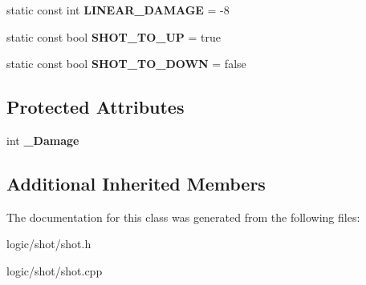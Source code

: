 \begin{DoxyCompactItemize}
\item 
\hypertarget{class_shot_a678ee4d5bb816dc0e0ece5f88e887ec3}{static const int {\bfseries L\-I\-N\-E\-A\-R\-\_\-\-D\-A\-M\-A\-G\-E} = -\/8}\label{class_shot_a678ee4d5bb816dc0e0ece5f88e887ec3}

\item 
\hypertarget{class_shot_a578cf779712b5b7752c3d900c062f49c}{static const bool {\bfseries S\-H\-O\-T\-\_\-\-T\-O\-\_\-\-U\-P} = true}\label{class_shot_a578cf779712b5b7752c3d900c062f49c}

\item 
\hypertarget{class_shot_a1e552f6e2ad653bf2b1313f870566a17}{static const bool {\bfseries S\-H\-O\-T\-\_\-\-T\-O\-\_\-\-D\-O\-W\-N} = false}\label{class_shot_a1e552f6e2ad653bf2b1313f870566a17}

\end{DoxyCompactItemize}
\subsection*{Protected Attributes}
\begin{DoxyCompactItemize}
\item 
\hypertarget{class_shot_a1aa9cf447026ba338930899bebde1d4b}{int {\bfseries \-\_\-\-Damage}}\label{class_shot_a1aa9cf447026ba338930899bebde1d4b}

\end{DoxyCompactItemize}
\subsection*{Additional Inherited Members}


The documentation for this class was generated from the following files\-:\begin{DoxyCompactItemize}
\item 
logic/shot/shot.\-h\item 
logic/shot/shot.\-cpp\end{DoxyCompactItemize}
